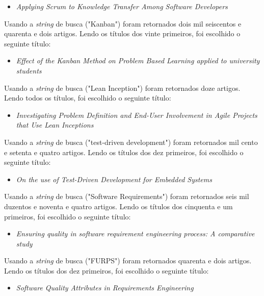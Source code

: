 \begin{itemize}
    \item \textit{Applying Scrum to Knowledge Transfer Among Software Developers}
\end{itemize}

Usando a \textit{string} de busca ("Kanban") foram retornados dois mil seiscentos e quarenta e dois artigos.
Lendo os títulos dos vinte primeiros, foi escolhido o seguinte título:

\begin{itemize}
    \item \textit{Effect of the Kanban Method on Problem Based Learning applied to university students}
\end{itemize}

Usando a \textit{string} de busca ("Lean Inception") foram retornados doze artigos.
Lendo todos os títulos, foi escolhido o seguinte título:

\begin{itemize}
    \item \textit{Investigating Problem Definition and End-User Involvement in Agile Projects that Use Lean Inceptions}
\end{itemize}

Usando a \textit{string} de busca ("test-driven development") foram retornados mil cento e setenta e quatro artigos.
Lendo os títulos dos dez primeiros, foi escolhido o seguinte título:

\begin{itemize}
    \item \textit{On the use of Test-Driven Development for Embedded Systems}
\end{itemize}

Usando a \textit{string} de busca ("Software Requirements") foram retornados seis mil duzentos e noventa e quatro artigos.
Lendo os títulos dos cinquenta e um primeiros, foi escolhido o seguinte título:

\begin{itemize}
    \item \textit{Ensuring quality in software requirement engineering process: A comparative study}
\end{itemize}

Usando a \textit{string} de busca ("FURPS") foram retornados quarenta e dois artigos.
Lendo os títulos dos dez primeiros, foi escolhido o seguinte título:

\begin{itemize}
    \item \textit{Software Quality Attributes in Requirements Engineering}
\end{itemize}


